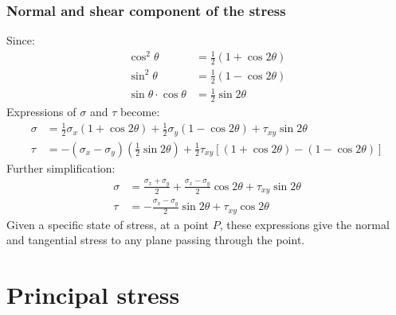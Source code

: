 \documentclass[class=report, crop=false, 12pt,a4paper]{standalone}
\begin{document}
\subsubsection{Normal and shear component of the stress}
Since:
\begin{align}
    \cos^2 \theta &= \frac{1}{2} \left(1 + \cos 2\theta\right)\\
    \sin^2 \theta &= \frac{1}{2} \left(1 - \cos 2\theta\right)\\
    \sin\theta \cdot \cos\theta &= \frac{1}{2}\sin 2\theta
\end{align}
Expressions of $\sigma$ and $\tau$ become:
\begin{align}
    \sigma &= \frac{1}{2} \sigma_x \left(1+\cos 2\theta \right) + \frac{1}{2}\sigma_y\left(1-\cos 2\theta\right) + \tau_{xy} \sin 2\theta\\
    \tau &= - \left(\sigma_x - \sigma_y\right) \left(\frac{1}{2}\sin 2\theta\right) + \frac{1}{2}\tau_{xy} \left[\left(1+\cos 2\theta\right)-\left(1-\cos 2\theta\right)\right]
\end{align}
Further simplification:
\begin{align}
    \sigma &= \frac{\sigma_x + \sigma_y}{2} + \frac{\sigma_x - \sigma_y}{2}\cos 2\theta + \tau_{xy}\sin 2\theta\\
    \tau &= - \frac{\sigma_x - \sigma_y}{2}\sin 2\theta + \tau_{xy}\cos 2\theta
\end{align}
Given a specific state of stress, at a point $P$, these expressions give the normal and tangential stress to any plane passing through the point.
\section{Principal stress}
\end{document}
